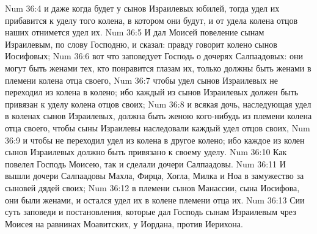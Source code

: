 Num 36:4  и даже когда будет у сынов Израилевых юбилей, тогда удел их прибавится к уделу того колена, в котором они будут, и от удела колена отцов наших отнимется удел их.
Num 36:5  И дал Моисей повеление сынам Израилевым, по слову Господню, и сказал: правду говорит колено сынов Иосифовых;
Num 36:6  вот что заповедует Господь о дочерях Салпаадовых: они могут быть женами тех, кто понравится глазам их, только должны быть женами в племени колена отца своего,
Num 36:7  чтобы удел сынов Израилевых не переходил из колена в колено; ибо каждый из сынов Израилевых должен быть привязан к уделу колена отцов своих;
Num 36:8  и всякая дочь, наследующая удел в коленах сынов Израилевых, должна быть женою кого-нибудь из племени колена отца своего, чтобы сыны Израилевы наследовали каждый удел отцов своих,
Num 36:9  и чтобы не переходил удел из колена в другое колено; ибо каждое из колен сынов Израилевых должно быть привязано к своему уделу.
Num 36:10  Как повелел Господь Моисею, так и сделали дочери Салпаадовы.
Num 36:11  И вышли дочери Салпаадовы Махла, Фирца, Хогла, Милка и Ноа в замужество за сыновей дядей своих;
Num 36:12  в племени сынов Манассии, сына Иосифова, они были женами, и остался удел их в колене племени отца их.
Num 36:13  Сии суть заповеди и постановления, которые дал Господь сынам Израилевым чрез Моисея на равнинах Моавитских, у Иордана, против Иерихона.



